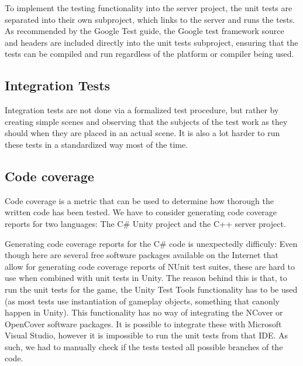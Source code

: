             To implement the testing functionality into the server project, 
            the unit tests are separated into their own subproject, which 
            links to the server and runs the tests. As recommended by the 
            Google Test guide, the Google test framework source and headers 
            are included directly into the unit tests subproject, ensuring 
            that the tests can be compiled and run regardless of the platform 
            or compiler being used.
		
		\subsection{Integration Tests} \label{ssec:integrationtests}
			Integration tests are not done via a formalized test procedure, but 
			rather by creating simple scenes and observing that the subjects of 
			the test work as they should when they are placed in an actual 
			scene. It is also a lot harder to run these tests in a standardized 
			way most of the time. 
		
		\subsection{Code coverage} \label{ssec:codecoverage}
			Code coverage is a metric that can be used to determine how thorough
			the written code has been tested. We have to consider generating 
            code coverage reports for two languages: The C\# Unity project and 
            the C++ server project. 
            
            Generating code coverage reports for the C\# code is unexpectedly 
            difficuly: Even though here are several free software packages 
            available on the Internet that allow for generating code
			coverage reports of NUnit test suites, these are hard to use when 
            combined with unit tests in Unity. The reason behind this is that, 
            to run the unit tests for the game, the Unity Test Tools 
            functionality has to be used (as most tests use instantiation of 
            gameplay objects, something that canonly happen in Unity). This 
            functionality has no way of integrating the NCover or OpenCover 
            software packages. It is possible to integrate these with Microsoft 
            Visual Studio, however it is impossible to run the unit tests from 
            that IDE. As such, we had to manually check if the tests tested all 
            possible branches of the code.
            

